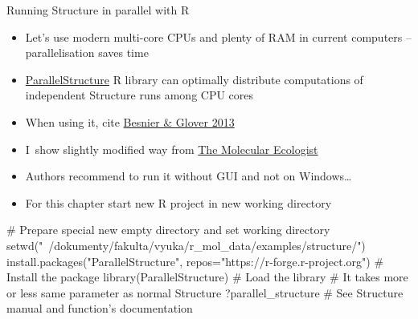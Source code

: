 \documentclass[compress, ucs, xelatex, 11pt, xcolor=svgnames,
  hyperref={
    bookmarks=true,
    unicode=true,
    colorlinks=true,
    pdftitle={Molecular data in R},
    plainpages=false,
    pdfauthor={Vojtech Zeisek},
    pdfsubject={Course about phylogeny and evolution in R},
    pdfcreator={XeLaTeX},
    pdfkeywords={R, evolution, phylogeny, molecular data},
    linkcolor=Tomato,
    anchorcolor=SaddleBrown,
    citecolor=Goldenrod,
    filecolor=DarkMagenta,
    menucolor=Sienna,
    urlcolor=DarkTurquoise,
    pdftex},
  url={hyphens, lowtilde} %
  ]{beamer}
\begin{document}
\begin{frame}[fragile]{Running Structure in parallel with R}
  \begin{itemize}
    \item Let's use modern multi-core CPUs and plenty of RAM in current computers -- parallelisation saves time
    \item \href{https://r-forge.r-project.org/R/?group_id=1636}{ParallelStructure} R library can optimally distribute computations of independent Structure runs among CPU cores
    \item When using it, cite \href{http://www.plosone.org/article/info\%3Adoi\%2F10.1371\%2Fjournal.pone.0070651}{Besnier \& Glover 2013}
    \item I~show slightly modified way from \href{http://www.molecularecologist.com/2013/09/using-r-to-run-parallel-analysis-of-population-genetic-data-in-structure-parallelstructure/}{The Molecular Ecologist}
    \item Authors recommend to run it without GUI and not on Windows\ldots
    \item For this chapter start new R project in new working directory
  \end{itemize}
  \begin{spluscode}
    # Prepare special new empty directory and set working directory
    setwd("~/dokumenty/fakulta/vyuka/r_mol_data/examples/structure/")
    install.packages("ParallelStructure",
      repos="https://r-forge.r-project.org") # Install the package
    library(ParallelStructure) # Load the library
    # It takes more or less same parameter as normal Structure
    ?parallel_structure # See Structure manual and function's documentation
  \end{spluscode}
\end{frame}
\end{document}
